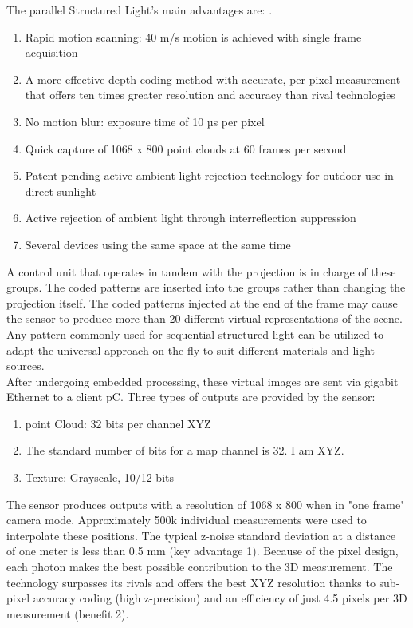 \documentclass[12pt]{article}
\begin{document}
The parallel Structured Light's main advantages are: \cite{ref15}.
\begin{enumerate}
 \item  Rapid motion scanning: 40 m/s motion is achieved with single frame acquisition
\item A more effective depth coding method with accurate, per-pixel measurement that offers ten times greater resolution and accuracy than rival technologies
 \item No motion blur: exposure time of 10 µs per pixel
 \item Quick capture of 1068 x 800 point clouds at 60 frames per second
\item Patent-pending active ambient light rejection technology for outdoor use in direct sunlight
 \item Active rejection of ambient light through interreflection suppression
\item Several devices using the same space at the same time\\
\end{enumerate}

A control unit that operates in tandem with the projection is in charge of these groups. The coded patterns are inserted into the groups rather than changing the projection itself. The coded patterns injected at the end of the frame may cause the sensor to produce more than 20 different virtual representations of the scene.  Any pattern commonly used for sequential structured light can be utilized to adapt the universal approach on the fly to suit different materials and light sources\cite{ref15}. \\

After undergoing embedded processing, these virtual images are sent via gigabit Ethernet to a client pC.  Three types of outputs are provided by the sensor: \cite{ref15}
\begin{enumerate}
    \item point Cloud: 32 bits per channel  XYZ 
    \item The standard number of bits for a map channel is 32. I am XYZ.
    \item Texture: Grayscale, 10/12 bits 
\end{enumerate}

The sensor produces outputs with a resolution of 1068 x 800 when in "one frame" camera mode.  Approximately 500k individual measurements were used to interpolate these positions. The typical z-noise standard deviation at a distance of one meter is less than 0.5 mm (key advantage 1).  Because of the pixel design, each photon makes the best possible contribution to the 3D measurement.  The technology surpasses its rivals and offers the best XYZ resolution thanks to sub-pixel accuracy coding (high z-precision) and an efficiency of just 4.5 pixels per 3D measurement (benefit 2)\cite{ref15}. \\
\end{document}
